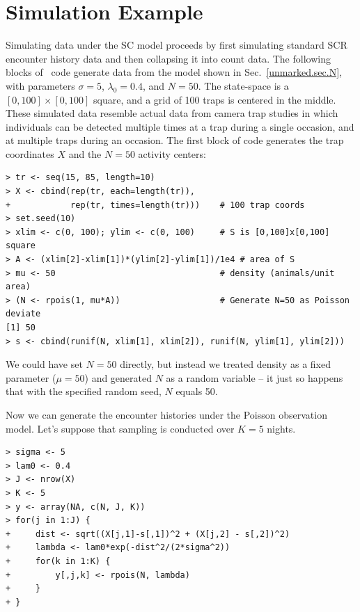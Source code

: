 \section{Simulation Example}

Simulating data under the SC model proceeds by first simulating
standard SCR encounter history data and then collapsing it into count
data. The following blocks of \R~code generate data from
the model shown in Sec.~\ref{unmarked.sec.N}, with parameters
$\sigma=5$, $\lambda_0=0.4$, and $N=50$. The state-space is a
$[0, 100] \times [0, 100]$ square, and a grid of 100 traps
is centered in the middle. These simulated data resemble actual
data from camera trap studies in which individuals can be detected multiple
times at a trap during a single occasion, and at multiple traps during
an occasion. The first block of code generates the trap coordinates
$X$ and the $N=50$ activity centers:
\begin{small}
\begin{verbatim}
> tr <- seq(15, 85, length=10)
> X <- cbind(rep(tr, each=length(tr)),
+            rep(tr, times=length(tr)))    # 100 trap coords
> set.seed(10)
> xlim <- c(0, 100); ylim <- c(0, 100)     # S is [0,100]x[0,100] square
> A <- (xlim[2]-xlim[1])*(ylim[2]-ylim[1])/1e4 # area of S
> mu <- 50                                 # density (animals/unit area)
> (N <- rpois(1, mu*A))                    # Generate N=50 as Poisson deviate
[1] 50
> s <- cbind(runif(N, xlim[1], xlim[2]), runif(N, ylim[1], ylim[2]))
\end{verbatim}
\end{small}
We could have set $N=50$ directly, but instead we treated density
as a fixed parameter ($\mu=50$) and generated $N$ as a random
variable -- it just so happens that with the specified random seed,
$N$ equals 50. %

Now we can generate the encounter histories under the
Poisson observation model. Let's suppose that sampling is conducted
over $K=5$ nights.
\begin{verbatim}
> sigma <- 5
> lam0 <- 0.4
> J <- nrow(X)
> K <- 5
> y <- array(NA, c(N, J, K))
> for(j in 1:J) {
+     dist <- sqrt((X[j,1]-s[,1])^2 + (X[j,2] - s[,2])^2)
+     lambda <- lam0*exp(-dist^2/(2*sigma^2))
+     for(k in 1:K) {
+         y[,j,k] <- rpois(N, lambda)
+     }
+ }
\end{verbatim}

